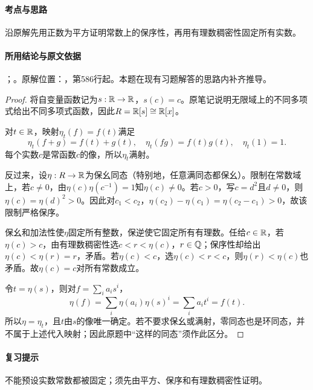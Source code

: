 \paragraph{考点与思路}

沿原解先用正数为平方证明常数上的保序性，再用有理数稠密性固定所有实数。

\paragraph{所用结论与原文依据}

；。原解位置：，第586行起。本题在现有习题解答的思路内补齐推导。


\begin{proof}

将自变量函数记为$s:\mathbb R\to\mathbb R$，$s(c)=c$。原笔记说明无限域上的不同多项式给出不同多项式函数，因此$R=\mathbb R[s]\cong\mathbb R[x]$。

对$t\in\mathbb R$，映射$\eta_t(f)=f(t)$满足
\[
\eta_t(f+g)=f(t)+g(t),\quad
\eta_t(fg)=f(t)g(t),\quad\eta_t(1)=1.
\]
每个实数$c$是常函数$c$的像，所以$\eta_t$满射。

反过来，设$\eta:R\to\mathbb R$为保幺同态（特别地，任意满同态都保幺）。限制在常数域上，若$c\ne0$，由$\eta(c)\eta(c^{-1})=1$知$\eta(c)\ne0$。若$c>0$，写$c=d^2$且$d\ne0$，则$\eta(c)=\eta(d)^2>0$。因此对$c_1<c_2$，$\eta(c_2)-\eta(c_1)=\eta(c_2-c_1)>0$，故该限制严格保序。

保幺和加法性使$\eta$固定所有整数，保逆使它固定所有有理数。任给$c\in\mathbb R$，若$\eta(c)>c$，由有理数稠密性选$c<r<\eta(c)$，$r\in\mathbb Q$；保序性却给出$\eta(c)<\eta(r)=r$，矛盾。若$\eta(c)<c$，选$\eta(c)<r<c$，则$\eta(r)<\eta(c)$也矛盾。故$\eta(c)=c$对所有常数成立。

令$t=\eta(s)$，则对$f=\sum_i a_is^i$，
\[
\eta(f)=\sum_i\eta(a_i)\eta(s)^i=\sum_i a_it^i=f(t).
\]
所以$\eta=\eta_t$，且$t$由$s$的像唯一确定。若不要求保幺或满射，零同态也是环同态，并不属于上述代入映射；因此原题中“这样的同态”须作此区分。

\end{proof}

\paragraph{复习提示}

不能预设实数常数都被固定；须先由平方、保序和有理数稠密性证明。



